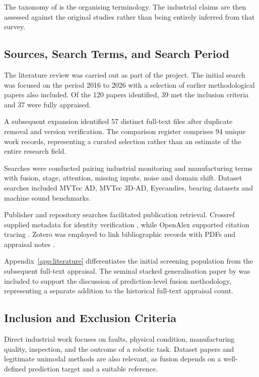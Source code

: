 The taxonomy of \textcite{baltrusaitis_multimodal_2019} is the organising terminology. The industrial claims are then assessed against the original
studies rather than being entirely inferred from that survey.

\subsection{Sources, Search Terms, and Search Period}

The literature review was carried out as part of the project. The initial search was focused on the
period 2016 to 2026 with a selection of earlier methodological papers also included. Of the 120
papers identified, 39 met the inclusion criteria and 37 were fully appraised.

A subsequent expansion identified 57 distinct full-text files after duplicate removal and version
verification. The comparison register comprises 94 unique work records, representing a curated
selection rather than an estimate of the entire research field.

Searches were conducted pairing industrial monitoring and manufacturing terms with fusion, stage,
attention, missing inputs, noise and domain shift. Dataset searches included MVTec AD, MVTec 3D-AD,
Eyecandies, bearing datasets and machine sound benchmarks.

Publisher and repository searches facilitated publication retrieval. Crossref supplied metadata for
identity verification \parencite{Crossref2020REST}, while OpenAlex supported citation tracing
\parencite{Priem2022OpenAlex}. Zotero was employed to link bibliographic records with PDFs and appraisal
notes \parencite{Zotero2026}.

Appendix~\ref{app:literature} differentiates the initial screening population from the subsequent
full-text appraisal. The seminal stacked generalisation paper by \textcite{ting_issues_1999} was included
to support the discussion of prediction-level fusion methodology,
representing a separate addition to the historical full-text appraisal count.

\subsection{Inclusion and Exclusion Criteria}

Direct industrial work focuses on faults, physical condition, manufacturing quality, inspection, and
the outcome of a robotic task. Dataset papers and legitimate unimodal methods are also relevant, as
fusion depends on a well-defined prediction target and a suitable reference.

